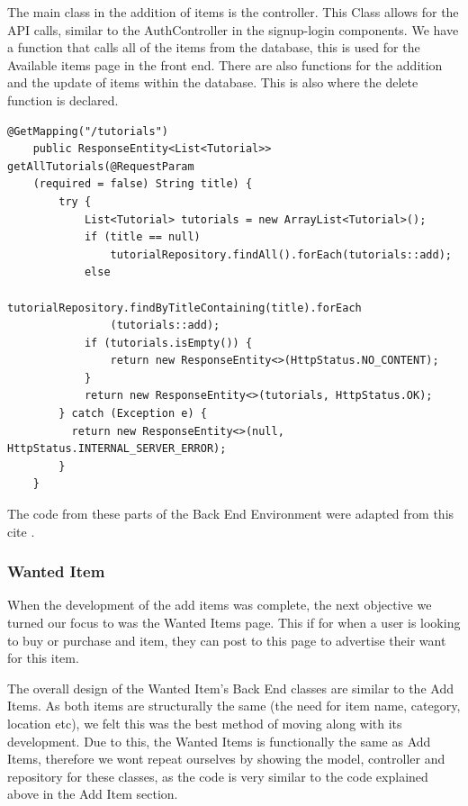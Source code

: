 The main class in the addition of items is the controller. This Class allows for the API calls, similar to the AuthController in the signup-login components. We have a function that calls all of the items from the database, this is used for the Available items page in the front end. There are also functions for the addition and the update of items within the database. This is also where the delete function is declared.
\begin{verbatim}
@GetMapping("/tutorials")
    public ResponseEntity<List<Tutorial>> getAllTutorials(@RequestParam
    (required = false) String title) {
        try {
            List<Tutorial> tutorials = new ArrayList<Tutorial>();
            if (title == null)
                tutorialRepository.findAll().forEach(tutorials::add);
            else
                tutorialRepository.findByTitleContaining(title).forEach
                (tutorials::add);
            if (tutorials.isEmpty()) {
                return new ResponseEntity<>(HttpStatus.NO_CONTENT);
            }
            return new ResponseEntity<>(tutorials, HttpStatus.OK);
        } catch (Exception e) {
          return new ResponseEntity<>(null, HttpStatus.INTERNAL_SERVER_ERROR);
        }
    }
\end{verbatim}
The code from these parts of the Back End Environment were adapted from this cite \cite{zKoder}.

\subsubsection{Wanted Item}
When the development of the add items was complete, the next objective we turned our focus to was the Wanted Items page. This if for when a user is looking to buy or purchase and item, they can post to this page to advertise their want for this item. \par
The overall design of the Wanted Item's Back End classes are similar to the Add Items. As both items are structurally the same (the need for item name, category, location etc), we felt this was the best method of moving along with its development. Due to this, the Wanted Items is functionally the same as Add Items, therefore we wont repeat ourselves by showing the model, controller and repository for these classes, as the code is very similar to the code explained above in the Add Item section. \par

